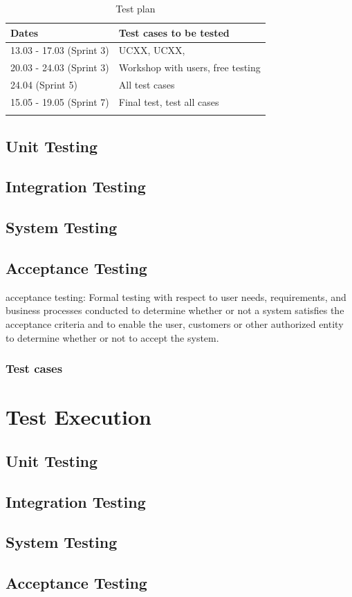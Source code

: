 \begin{longtable}{|l|l|}
\hline
\rowcolor{Gray}
\textbf{Dates} & \textbf{Test cases to be tested} \\
\hline
13.03 - 17.03 (Sprint 3) & UCXX, UCXX,   \\
\hline
20.03 - 24.03 (Sprint 3) & Workshop with users, free testing\\
\hline
24.04 (Sprint 5) & All test cases \\
\hline
15.05 - 19.05 (Sprint 7) & Final test, test all cases  \\
\hline
\caption{Test plan}
\label{Test plan}
\end{longtable}


\subsection{Unit Testing}

\subsection{Integration Testing}

\subsection{System Testing}

\subsection{Acceptance Testing}
acceptance testing: Formal testing with respect to user needs, requirements, and business processes conducted to determine  whether or not a system satisfies the acceptance criteria and to enable the user, customers or other authorized entity to determine whether or not to accept the system. \cite{acceptanceTesting}

\subsubsection{Test cases}


\section{Test Execution}
\subsection{Unit Testing}

\subsection{Integration Testing}

\subsection{System Testing}

\subsection{Acceptance Testing}

\cleardoublepage